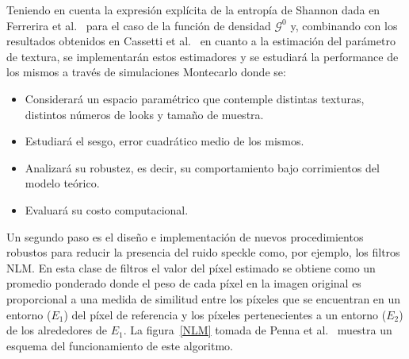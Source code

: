 \documentclass[11pt]{article}
\begin{document}
 Teniendo en cuenta la expresión explícita de la entropía de Shannon dada en Ferrerira et al.~\cite{Ferreira2020} para el caso de la función de densidad $\mathcal{G}^0$ y, combinando con los resultados obtenidos en Cassetti et al.~\cite{Cassetti2020} en cuanto a la estimación del parámetro de textura, se implementarán estos estimadores y se estudiará la performance de los mismos a través de simulaciones Montecarlo donde se:
\begin{itemize}
	\item Considerará un espacio paramétrico que contemple distintas texturas, distintos números de looks y tamaño de muestra.
	\item Estudiará el sesgo, error cuadrático medio de los mismos.
	\item Analizará su robustez, es decir, su comportamiento bajo corrimientos del modelo teórico. 
	\item Evaluará su costo computacional.
\end{itemize} 


Un segundo paso es el diseño e implementación de nuevos procedimientos robustos para reducir la presencia del ruido speckle como, por ejemplo, los filtros NLM. En esta clase de filtros el valor del píxel estimado se obtiene como un promedio ponderado donde el peso de cada píxel en la imagen original es proporcional a una medida de similitud entre los píxeles que se encuentran en
un entorno ($E_1$) del píxel de referencia y los píxeles pertenecientes a un entorno ($E_2$) de los alrededores de $E_1$. La figura~\ref{NLM} tomada de Penna et al.~\cite{Penna2013} muestra un esquema del funcionamiento de este algoritmo. 
\end{document}
